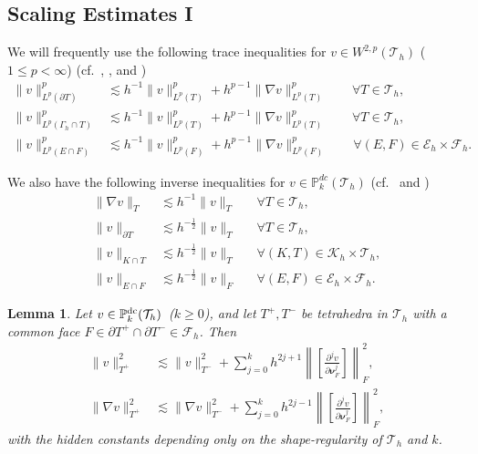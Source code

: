 \documentclass[10pt, a4paper]{amsart}
\newcommand{\p}{\partial}
\newcommand{\nab}{\nabla}
\newcommand{\calT}{\mathcal{T}}
\newcommand{\calE}{\mathcal{E}}
\newcommand{\calF}{\mathcal{F}}
\newcommand{\calK}{\mathcal{K}}
\newcommand{\bnu}{{\bm \nu}}
\newtheorem{lemma}[theorem]{Lemma}
\theoremstyle{definition}
\theoremstyle{remark}
\theoremstyle{example}
\numberwithin{equation}{section}
\begin{document}
\subsection{Scaling Estimates I}
We will frequently use the following trace inequalities for $v\in W^{2,p}(\calT_h)$ ($1\le p<\infty$)
(cf.~\cite[(12.16)]{ern2021finite}, \cite[(4.4)]{reusken2015analysis}, and \cite[(15)]{hansbo2003finite})
\begin{align}
\|v\|_{L^p(\partial T)}^p
& \lesssim h^{-1}\|v\|_{L^p(T)}^p + h^{p-1}\|\nab v\|_{L^p(T)}^p \qquad \forall T \in \calT_h, \label{trace-inequ-1} \\
\|v\|_{L^p(\Gamma_h \cap T)}^p
& \lesssim h^{-1}\|v\|_{L^p(T)}^p+ h^{p-1}\|\nab v\|_{L^p(T)}^p \qquad \forall T \in \calT_h, \label{trace-inequ-2} \\
\|v\|_{L^p(E \cap F)}^p
& \lesssim h^{-1}\|v\|_{L^p(F)}^p + h^{p-1}\|\nab v\|_{L^p(F)}^p \qquad \forall (E,F) \in \calE_h \times \calF_h. 
 \label{trace-inequ-3}
\end{align}





%
We also have the following inverse inequalities for $v \in \mathbb{P}_k^{dc}(\calT_h)$
(cf.~\cite[(1.36)--(1.37)]{di2011mathematical} and \cite[Sec. 4]{hansbo2003finite})
\begin{align}
\|\nab v\|_T
& \lesssim h^{- 1}\|v\|_T & & \forall T \in \calT_h, \label{inverse-est-1} \\
\|v\|_{\partial T}
& \lesssim h^{- \frac{1}{2}}\|v\|_T & & \forall T \in \calT_h, \label{inverse-est-2} \\
\|v\|_{K \cap T}
& \lesssim h^{- \frac{1}{2}}\|v\|_T & & \forall (K, T) \in \calK_h \times \calT_h, \label{inverse-est-3} \\
\|v\|_{E \cap F}
& \lesssim h^{- \frac{1}{2}}\|v\|_F & & \forall (E, F) \in \calE_h \times \calF_h. \label{inverse-est-4}
\end{align}


\begin{lemma}\label{lem:NeighborCompare}
Let $v\in \mathbb{P}_k^{\rm dc}(\calT_h)$\ ($k\ge 0$),
and let $T^+,T^-$ be tetrahedra in $\calT_h$ with a common
face $F\in \p T^+\cap \p T^-\in \calF_h$.
Then
%
\begin{align}
\|v\|_{T^+}^2
& \lesssim \|v\|_{T^-}^2 + \sum_{j = 0}^{k}h^{2j + 1}\left\|\left[\frac{\p^j v}{\p\bnu_F^j}\right]\right\|_F^2, \label{F-1} \\
\|\nab v\|_{T^+}^2
& \lesssim \|\nab v\|_{T^-}^2 + \sum_{j = 0}^{k}h^{2j - 1}\left\|\left[\frac{\p^jv}{\p\bnu_F^j}\right]\right\|_F^2, \label{F-2}
\end{align}
with the hidden constants depending only on the shape-regularity of $\calT_h$ and $k$.
\end{lemma}
\end{document}
